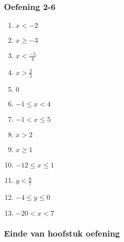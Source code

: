 {\begin{multicols}{3}
\subsubsection*{Oefening 2-6} %


\begin{enumerate}[itemsep=1pt,, label=\textbf{\arabic*}. ] 
    \item $x <-2$%
    \item $x \geq -3$%
    \item $x < \frac{-5}{4}$ %
\item $x> \frac{2}{5}$
    \item $0$%
    \item $-1 \leq x < 4$%
    \item $-1 < x \leq 5$%
    \item $x > 2$%
\item $x \geq 1$ %
\item $-12 \leq x \leq 1$ %
\item $y < \frac{6}{7}$ %
\item $-4 \leq y \leq 0$ %
\item $-20 < x<7$ %
    \end{enumerate}

\subsubsection*{Einde van hoofstuk oefening} %



\end{multicols}}

